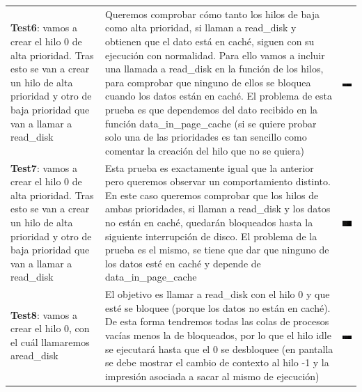 \documentclass[10pt, spanish, pdftex]{template/UC3M_document}
\begin{document}
\begin{table}[h!]
    \centering
    \begin{tabular}{|C{0.15\textwidth}|C{0.4\textwidth}|C{0.35\textwidth}|}
    \hline
     &  &  \\ \hline
    \textbf{Test6}: vamos a crear el hilo 0 de alta prioridad. Tras esto se van a crear un hilo de alta prioridad y otro de baja prioridad que van a llamar a read\_disk & Queremos comprobar cómo tanto los hilos de baja como alta prioridad, si llaman a read\_disk y obtienen que el dato está en caché, siguen con su ejecución con normalidad. Para ello vamos a incluir una llamada a read\_disk en la función de los hilos, para comprobar que ninguno de ellos se bloquea cuando los datos están en caché. El problema de esta prueba es que dependemos del dato recibido en la función data\_in\_page\_cache (si se quiere probar solo una de las prioridades es tan sencillo como comentar la creación del hilo que no se quiera) & \includegraphics[width=5.5cm]{arboles/test6.png} \\ \hline
    \textbf{Test7}: vamos a crear el hilo 0 de alta prioridad. Tras esto se van a crear un hilo de alta prioridad y otro de baja prioridad que van a llamar a read\_disk & Esta prueba es exactamente igual que la anterior pero queremos observar un comportamiento distinto. En este caso queremos comprobar que los hilos de ambas prioridades, si llaman a read\_disk y los datos no están en caché, quedarán bloqueados hasta la siguiente interrupción de disco. El problema de la prueba es el mismo, se tiene que dar que ninguno de los datos esté en caché y depende de data\_in\_page\_cache & \includegraphics[width=5.5cm]{arboles/test7.png} \\\hline
    \textbf{Test8}: vamos a crear el hilo 0, con el cuál llamaremos aread\_disk & El objetivo es llamar a read\_disk con el hilo 0 y que esté se bloquee (porque los datos no están en caché). De esta forma tendremos todas las colas de procesos vacías menos la de bloqueados, por lo que el hilo idle se ejecutará hasta que el 0 se desbloquee (en pantalla se debe mostrar el cambio de contexto al hilo -1 y la impresión asociada a sacar al mismo de ejecución) & \includegraphics[width=5.5cm]{arboles/test8.png} \\\hline
   

\end{tabular}
\end{table}
\end{document}
